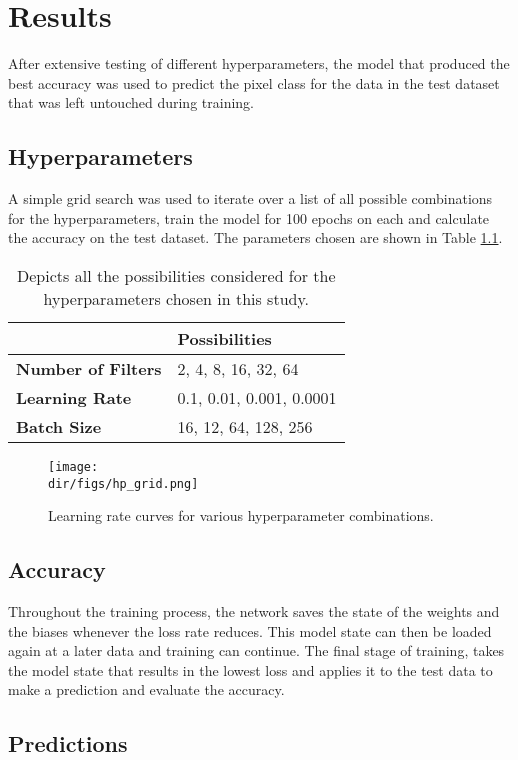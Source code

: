 \chapter{Results}
After extensive testing of different hyperparameters, the model that produced the best accuracy was used to predict the pixel class for the data in the test dataset that was left untouched during training. 
\section{Hyperparameters}
A simple grid search was used to iterate over a list of all possible combinations for the hyperparameters, train the model for 100 epochs on each and calculate the accuracy on the test dataset. The parameters chosen are shown in Table \ref{tab.grid_search}. 
\begin{table}[htbp]
\centering 
\begin{tabular}{l|l}
                           & \textbf{Possibilities}   \\ \hline
\textbf{Number of Filters} & 2, 4, 8, 16, 32, 64      \\ 
\textbf{Learning Rate}     & 0.1, 0.01, 0.001, 0.0001 \\ 
\textbf{Batch Size}        & 16, 12, 64, 128, 256     \\ 
\end{tabular}
\caption[Hyperparameter possibilities]{Depicts all the possibilities considered for the hyperparameters chosen in this study.}
\label{tab.grid_search}
\end{table}
\begin{figure}[htpb]
    \centering
    \texttt{[image: \\dir/figs/hp\_grid.png]}
    \caption[Learning Rate Curves for Various Hyperparameter Combinations]{Learning rate curves for various hyperparameter combinations.}
    \label{fig.hyperparameters}
\end{figure}
\section{Accuracy}
Throughout the training process, the network saves the state of the weights and the biases whenever the loss rate reduces. This model state can then be loaded again at a later data and training can continue. The final stage of training, takes the model state that results in the lowest loss and applies it to the test data to make a prediction and evaluate the accuracy.
\section{Predictions}



